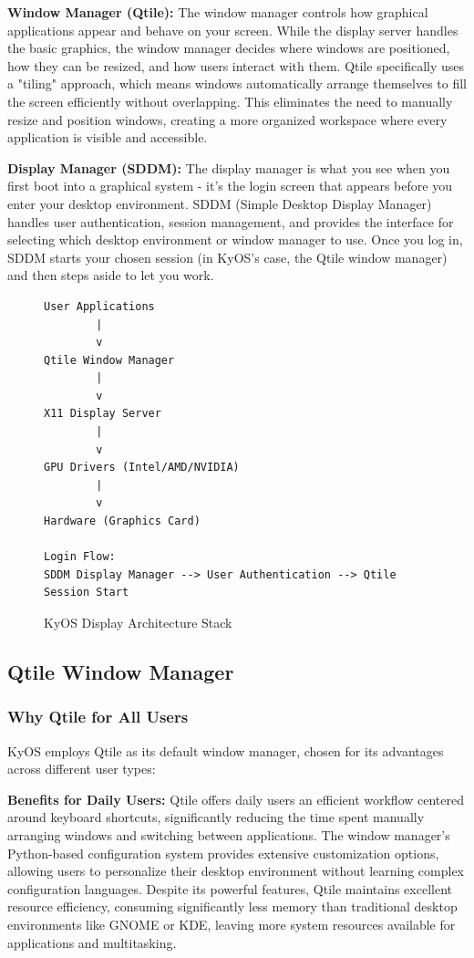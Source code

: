 \documentclass[12pt,a4paper]{article}
\begin{document}
\textbf{Window Manager (Qtile):}
The window manager controls how graphical applications appear and behave on your screen. While the display server handles the basic graphics, the window manager decides where windows are positioned, how they can be resized, and how users interact with them. Qtile specifically uses a "tiling" approach, which means windows automatically arrange themselves to fill the screen efficiently without overlapping. This eliminates the need to manually resize and position windows, creating a more organized workspace where every application is visible and accessible.

\textbf{Display Manager (SDDM):}
The display manager is what you see when you first boot into a graphical system - it's the login screen that appears before you enter your desktop environment. SDDM (Simple Desktop Display Manager) handles user authentication, session management, and provides the interface for selecting which desktop environment or window manager to use. Once you log in, SDDM starts your chosen session (in KyOS's case, the Qtile window manager) and then steps aside to let you work.

\begin{figure}[H]
\centering
\begin{lstlisting}[caption=KyOS Display Stack]
User Applications
        |
        v
Qtile Window Manager
        |
        v
X11 Display Server
        |
        v
GPU Drivers (Intel/AMD/NVIDIA)
        |
        v
Hardware (Graphics Card)

Login Flow:
SDDM Display Manager --> User Authentication --> Qtile Session Start
\end{lstlisting}
\caption{KyOS Display Architecture Stack}
\end{figure}

\subsection{Qtile Window Manager}

\subsubsection{Why Qtile for All Users}
KyOS employs Qtile as its default window manager, chosen for its advantages across different user types:

\textbf{Benefits for Daily Users:}
Qtile offers daily users an efficient workflow centered around keyboard shortcuts, significantly reducing the time spent manually arranging windows and switching between applications. The window manager's Python-based configuration system provides extensive customization options, allowing users to personalize their desktop environment without learning complex configuration languages. Despite its powerful features, Qtile maintains excellent resource efficiency, consuming significantly less memory than traditional desktop environments like GNOME or KDE, leaving more system resources available for applications and multitasking.
\end{document}
